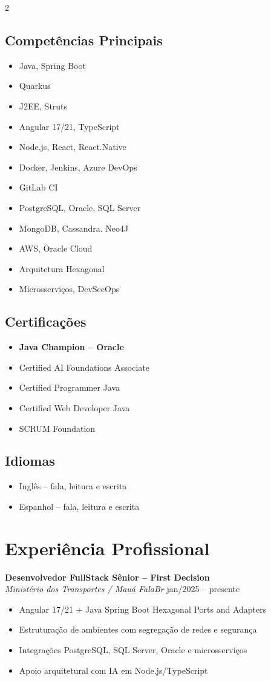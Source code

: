 \documentclass[a4paper,11pt]{article}
\newcommand{\sectionleft}[1]{\subsection*{#1}}
\newcommand{\sectionright}[1]{\section*{#1}}
\begin{document}
\begin{paracol}{2}

\sectionleft{Competências Principais}
\begin{itemize}
    \item Java, Spring Boot
    \item Quarkus
    \item J2EE, Struts
    \item Angular 17/21, TypeScript
    \item Node.js, React, React.Native
    \item Docker, Jenkins, Azure DevOps
    \item GitLab CI
    \item PostgreSQL, Oracle, SQL Server
    \item MongoDB, Cassandra. Neo4J
    \item AWS, Oracle Cloud
    \item Arquitetura Hexagonal
    \item Microsserviços, DevSecOps
\end{itemize}

\vspace{4pt}
\sectionleft{Certificações}
\begin{itemize}
    \item \textbf{Java Champion – Oracle}
    \item Certified AI Foundations Associate
    \item Certified Programmer Java 
    \item Certified Web Developer Java 
    \item SCRUM Foundation
\end{itemize}

\vspace{4pt}
\sectionleft{Idiomas}
\begin{itemize}
    \item Inglês – fala, leitura e escrita
    \item Espanhol – fala, leitura e escrita
\end{itemize}

\switchcolumn

\sectionright{Experiência Profissional}

\textbf{Desenvolvedor FullStack Sênior – First Decision} \\ 
\textit{Ministério dos Transportes / Mauá FalaBr}
\hfill jan/2025 – presente
\begin{itemize}
    \item Angular 17/21 + Java Spring Boot Hexagonal Ports and Adapters
    \item Estruturação de ambientes com segregação de redes e segurança
    \item Integrações PostgreSQL, SQL Server, Oracle e microsserviços
    \item Apoio arquitetural com IA em Node.js/TypeScript
\end{itemize}


\end{paracol}
\end{document}
